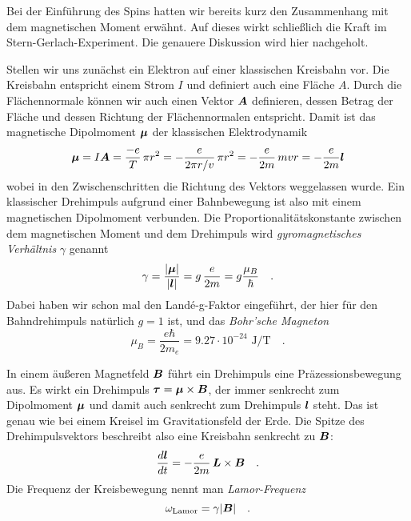 Bei der Einführung des Spins hatten wir bereits kurz den Zusammenhang mit dem magnetischen Moment erwähnt. Auf dieses wirkt schließlich die Kraft im Stern-Gerlach-Experiment. Die genauere Diskussion wird hier nachgeholt.

Stellen wir uns zunächst ein Elektron auf einer klassischen Kreisbahn vor. Die Kreisbahn entspricht einem Strom $I$ und definiert auch eine Fläche $A$. Durch die Flächennormale können wir auch einen Vektor $\boldsymbol{A}$ definieren, dessen Betrag der Fläche und dessen Richtung der Flächennormalen entspricht. Damit ist das magnetische Dipolmoment $\boldsymbol{\mu}$ der klassischen Elektrodynamik 
\begin{equation}
    \boldsymbol{\mu} = I \boldsymbol{A} = \frac{-e}{T} \, \pi r^2 = - \frac{e}{2\pi r/v} \, \pi r^2 
= -\frac{e}{2m} \, m v r = - \frac{e}{2m} \boldsymbol{l}
\end{equation}
wobei in den Zwischenschritten die Richtung des Vektors weggelassen wurde. Ein klassischer Drehimpuls aufgrund einer Bahnbewegung ist also mit einem magnetischen Dipolmoment verbunden. Die Proportionalitätskonstante zwischen dem magnetischen Moment und dem Drehimpuls wird \emph{gyromagnetisches Verhältnis} $\gamma$ genannt
\begin{equation}
    \gamma  = \frac{|\boldsymbol{\mu}|}{|\boldsymbol{l}|} = g \, \frac{e}{2m} = g \frac{\mu_B}{\hbar} \quad .
\end{equation}
Dabei haben wir schon mal den Landé-g-Faktor eingeführt, der hier für den Bahndrehimpuls natürlich $g=1$ ist, und das \emph{Bohr'sche Magneton} 
\begin{equation}
\mu_B = \frac{e \hbar}{2 m_e} = 9.27 \cdot 10^{-24} \text{ J/T}     \quad .
\end{equation}



In einem äußeren Magnetfeld $\boldsymbol{B}$ führt ein Drehimpuls eine Präzessionsbewegung aus. Es wirkt ein Drehimpuls $\boldsymbol{\tau} = \boldsymbol{\mu} \times \boldsymbol{B}$, der immer senkrecht zum Dipolmoment $\boldsymbol{\mu}$ und damit auch senkrecht zum Drehimpuls $\boldsymbol{l}$ steht. Das ist genau wie bei einem Kreisel im Gravitationsfeld der Erde. Die Spitze des Drehimpulsvektors beschreibt also eine Kreisbahn senkrecht zu $\boldsymbol{B}$:
\begin{equation}
    \frac{d \boldsymbol{l}}{dt} = - \frac{e}{2m} \, \boldsymbol{L} \times \boldsymbol{B}  \quad .
\end{equation}
Die Frequenz der Kreisbewegung nennt man \emph{Lamor-Frequenz}
\begin{equation}
    \omega_\text{Lamor} = \gamma | \boldsymbol{B} |  \quad .
\end{equation}


